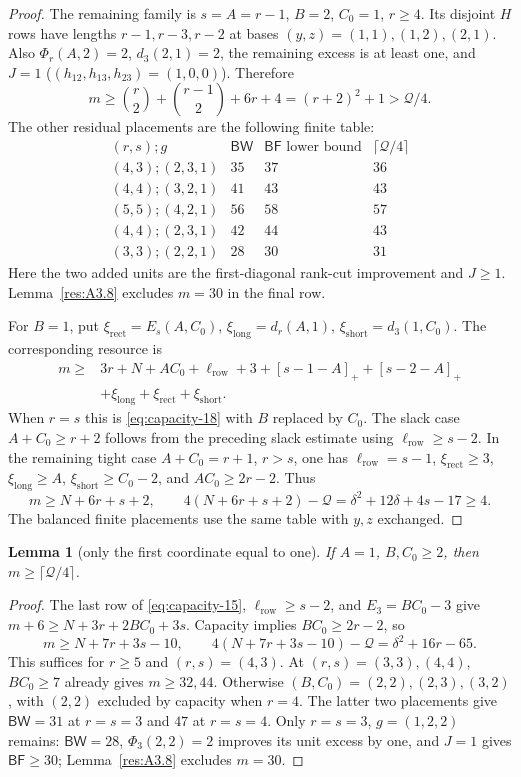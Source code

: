 \documentclass[11pt]{article}
\newtheorem{lemma}[theorem]{Lemma}
\theoremstyle{definition}
\theoremstyle{remark}
\theoremstyle{plain}
\begin{document}
\begin{proof}
The remaining family is $s=A=r-1$, $B=2$, $C_0=1$, $r\ge4$.
Its disjoint $H$ rows have lengths $r-1,r-3,r-2$ at bases
$(y,z)=(1,1),(1,2),(2,1)$.  Also $\Phi_r(A,2)=2$,
$d_3(2,1)=2$, the remaining excess is at least one, and $J=1$
($(h_{12},h_{13},h_{23})=(1,0,0)$).  Therefore
\[
 m\ge\binom r2+\binom{r-1}2+6r+4=(r+2)^2+1>\mathcal Q/4.
\]
The other residual placements are the following finite table:
\[
\begin{array}{c|r|r|r}
(r,s);g&\mathsf{BW}&\mathsf{BF}\text{ lower bound}&\lceil \mathcal Q/4\rceil\\\hline
(4,3);(2,3,1)&35&37&36\\
(4,4);(3,2,1)&41&43&43\\
(5,5);(4,2,1)&56&58&57\\
(4,4);(2,3,1)&42&44&43\\
(3,3);(2,2,1)&28&30&31
\end{array}
\]
Here the two added units are the first-diagonal rank-cut improvement
and $J\ge1$.  Lemma~\ref{res:A3.8} excludes $m=30$ in the final row.

For $B=1$, put $\xi_{\mathrm{rect}}=E_s(A,C_0)$, $\xi_{\mathrm{long}}=d_r(A,1)$, $\xi_{\mathrm{short}}=d_3(1,C_0)$.
The corresponding resource is
\[
\begin{split}
 m\ge{}&3r+N+AC_0+\ell_{\mathrm{row}}+3+[s-1-A]_++[s-2-A]_+\\
 &+\xi_{\mathrm{long}}+\xi_{\mathrm{rect}}+\xi_{\mathrm{short}}.
\end{split}\tag{3.20}\label{eq:capacity-20}
\]
When $r=s$ this is \eqref{eq:capacity-18} with $B$ replaced by $C_0$.
The slack case $A+C_0\ge r+2$ follows from the preceding slack estimate
using $\ell_{\mathrm{row}}\ge s-2$.  In the remaining tight case $A+C_0=r+1$, $r>s$,
one has $\ell_{\mathrm{row}}=s-1$, $\xi_{\mathrm{rect}}\ge3$, $\xi_{\mathrm{long}}\ge A$, $\xi_{\mathrm{short}}\ge C_0-2$, and
$AC_0\ge2r-2$.  Thus
\[
 m\ge N+6r+s+2,\qquad
 4(N+6r+s+2)-\mathcal Q=\delta^2+12\delta+4s-17\ge4.
\]
The balanced finite placements use the same table with $y,z$ exchanged.
\end{proof}

\begin{lemma}[only the first coordinate equal to one]\label{res:A3.5}
If $A=1$, $B,C_0\ge2$, then $m\ge\lceil \mathcal Q/4\rceil$.
\end{lemma}
\begin{proof}
The last row of \eqref{eq:capacity-15}, $\ell_{\mathrm{row}}\ge s-2$, and $E_3=BC_0-3$ give
$m+6\ge N+3r+2BC_0+3s$.  Capacity implies
$BC_0\ge2r-2$, so
\[
 m\ge N+7r+3s-10,\qquad
 4(N+7r+3s-10)-\mathcal Q=\delta^2+16r-65.
\]
This suffices for $r\ge5$ and $(r,s)=(4,3)$.
At $(r,s)=(3,3),(4,4)$, $BC_0\ge7$ already gives $m\ge32,44$.
Otherwise $(B,C_0)=(2,2),(2,3),(3,2)$, with $(2,2)$ excluded by
capacity when $r=4$.  The latter two placements give
$\mathsf{BW}=31$ at $r=s=3$ and $47$ at $r=s=4$.
Only $r=s=3$, $g=(1,2,2)$ remains: $\mathsf{BW}=28$,
$\Phi_3(2,2)=2$ improves its unit excess by one, and $J=1$ gives
$\mathsf{BF}\ge30$; Lemma~\ref{res:A3.8} excludes $m=30$. \end{proof}
\end{document}
